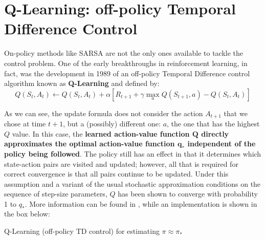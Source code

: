\section{Q-Learning: off-policy Temporal Difference Control}
On-policy methods like SARSA are not the only ones available to tackle the control problem. One of the early breakthroughs in reinforcement learning, in fact, was the development in 1989 of an off-policy Temporal Difference control algorithm known as \textbf{Q-Learning} and defined by:
\begin{equation}
    Q(S_t,A_t) \leftarrow Q(S_t,A_t) + \alpha \left[ R_{t+1} + \gamma \max_a Q(S_{t+1},a) - Q(S_t,A_t) \right]
    \label{eq:ch5-qlearningupdaterule}
\end{equation}

As we can see, the update formula does not consider the action $A_{t+1}$ that we chose at time $t+1$, but a (possibly) different one: $a$, the one that has the highest $Q$ value. In this case, the \textbf{learned action-value function $\boldsymbol{Q}$ directly approximates the optimal action-value function $\boldsymbol{q_*}$ independent of the policy being followed}. The policy still has an effect in that it determines which state-action pairs are visited and updated; however, all that is required for correct convergence is that all pairs continue to be updated. Under this assumption and a variant of the usual stochastic approximation conditions on the sequence of step-size parameters, $Q$ has been shown to converge with probability 1 to $q_*$. More information can be found in \cite{Watkins1992}, while an implementation is shown in the box below:

\begin{algorithm}[H]
\DontPrintSemicolon
\SetAlgoVlined
\Parameters{step size $\alpha \in \left] 0,1 \right]$, small $\varepsilon > 0$}

\caption{Q-Learning (off-policy TD control) for estimating $\pi \approx \pi_*$}
\end{algorithm}


